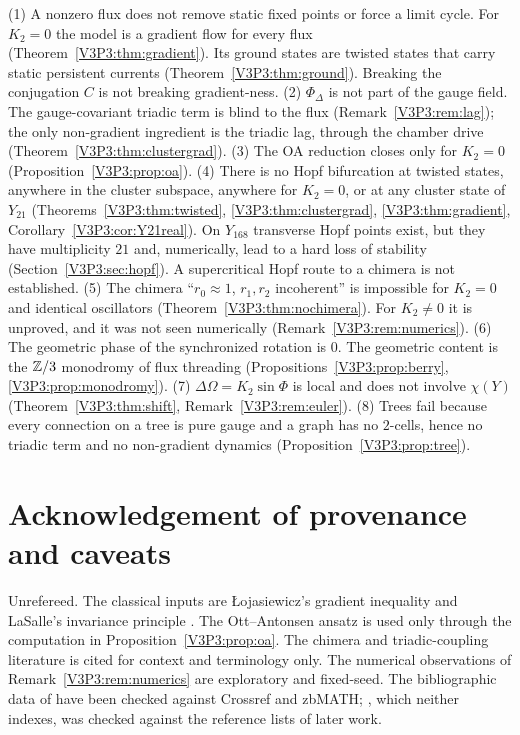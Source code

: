 \begin{remark}\label{V3P3:rem:corrections}
(1) A nonzero flux does not remove static fixed points or force a limit cycle. For $K_2=0$
the model is a gradient flow for every flux (Theorem~\ref{V3P3:thm:gradient}). Its ground
states are twisted states that carry static persistent currents
(Theorem~\ref{V3P3:thm:ground}). Breaking the conjugation $C$ is not breaking
gradient-ness. (2) $\Phi_\Delta$ is not part of the gauge field. The gauge-covariant triadic
term is blind to the flux (Remark~\ref{V3P3:rem:lag}); the only non-gradient ingredient is
the triadic lag, through the chamber drive (Theorem~\ref{V3P3:thm:clustergrad}). (3) The OA
reduction closes only for $K_2=0$ (Proposition~\ref{V3P3:prop:oa}). (4) There is no Hopf
bifurcation at twisted states, anywhere in the cluster subspace, anywhere for $K_2=0$, or at
any cluster state of $Y_{21}$ (Theorems~\ref{V3P3:thm:twisted}, \ref{V3P3:thm:clustergrad},
\ref{V3P3:thm:gradient}, Corollary~\ref{V3P3:cor:Y21real}). On $Y_{168}$ transverse Hopf points
exist, but they have multiplicity $21$ and, numerically, lead to a hard loss of stability
(Section~\ref{V3P3:sec:hopf}). A supercritical Hopf route to a chimera is not established. (5) The chimera ``$r_0\approx1$, $r_1,r_2$ incoherent'' is
impossible for $K_2=0$ and identical oscillators (Theorem~\ref{V3P3:thm:nochimera}). For
$K_2\ne0$ it is unproved, and it was not seen numerically
(Remark~\ref{V3P3:rem:numerics}). (6) The geometric phase of the synchronized rotation is
$0$. The geometric content is the $\mathbb{Z}/3$ monodromy of flux threading
(Propositions~\ref{V3P3:prop:berry}, \ref{V3P3:prop:monodromy}). (7) $\Delta\Omega=K_2\sin
\Phi$ is local and does not involve $\chi(Y)$ (Theorem~\ref{V3P3:thm:shift},
Remark~\ref{V3P3:rem:euler}). (8) Trees fail because every connection on a tree is pure gauge
and a graph has no $2$-cells, hence no triadic term and no non-gradient dynamics
(Proposition~\ref{V3P3:prop:tree}).
\end{remark}

\section*{Acknowledgement of provenance and caveats}

Unrefereed. The classical inputs are \L{}ojasiewicz's gradient inequality \cite{Loj63} and
LaSalle's invariance principle \cite{LaSalle60}. The Ott--Antonsen ansatz \cite{OA08} is used
only through the computation in Proposition~\ref{V3P3:prop:oa}. The chimera and triadic-coupling
literature \cite{KB02,AMSW08,SK86,SA19} is cited for context and terminology only. The
numerical observations of Remark~\ref{V3P3:rem:numerics} are exploratory and fixed-seed. The
bibliographic data of \cite{Loj63,LaSalle60,OA08,AMSW08,SK86,SA19} have been checked against Crossref and
zbMATH; \cite{KB02}, which neither indexes, was checked against the reference lists of later work.
